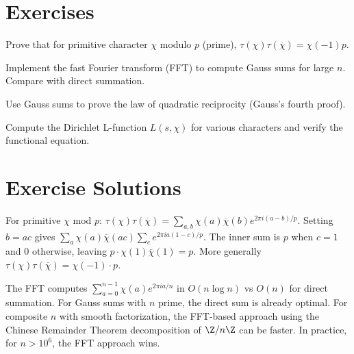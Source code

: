 \section{Exercises}

\begin{exercise}
Prove that for primitive character $\chi$ modulo $p$ (prime), $\tau(\chi) \tau(\overline{\chi}) = \chi(-1) p$.
\end{exercise}

\begin{exercise}
Implement the fast Fourier transform (FFT) to compute Gauss sums for large $n$. Compare with direct summation.
\end{exercise}

\begin{exercise}
Use Gauss sums to prove the law of quadratic reciprocity (Gauss's fourth proof).
\end{exercise}

\begin{exercise}
Compute the Dirichlet L-function $L(s, \chi)$ for various characters and verify the functional equation.
\end{exercise}



\section{Exercise Solutions}

\begin{solution}
For primitive $\chi$ mod $p$: $\tau(\chi)\tau(\overline{\chi}) = \sum_{a,b} \chi(a)\overline{\chi}(b) e^{2\pi i(a-b)/p}$. Setting $b = ac$ gives $\sum_a \chi(a)\overline{\chi}(ac) \sum_c e^{2\pi i a(1-c)/p}$. The inner sum is $p$ when $c = 1$ and $0$ otherwise, leaving $p \cdot \chi(1)\overline{\chi}(1) = p$. More generally $\tau(\chi)\tau(\overline{\chi}) = \chi(-1) \cdot p$.
\end{solution}

\begin{solution}
The FFT computes $\sum_{a=0}^{n-1} \chi(a) e^{2\pi i a/n}$ in $O(n \log n)$ vs $O(n)$ for direct summation. For Gauss sums with $n$ prime, the direct sum is already optimal. For composite $n$ with smooth factorization, the FFT-based approach using the Chinese Remainder Theorem decomposition of $\Z/n\Z$ can be faster. In practice, for $n > 10^6$, the FFT approach wins.
\end{solution}

